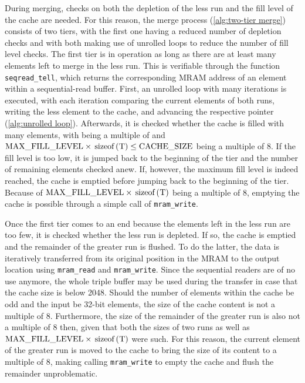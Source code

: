 During merging, checks on both the depletion of the less run and the fill level of the cache are needed.
For this reason, the merge process (\cref{alg:two-tier merge}) consists of two tiers, with the first one having a reduced number of depletion checks and with both making use of unrolled loops to reduce the number of fill level checks.
The first tier is in operation as long as there are at least \unrollfactor{} many elements left to merge in the less run.
This is verifiable through the function \lstinline|seqread_tell|, which returns the corresponding MRAM address of an element within a sequential-read buffer.
First, an unrolled loop with \unrollfactor{} many iterations is executed, with each iteration comparing the current elements of both runs, writing the less element to the cache, and advancing the respective pointer (\cref{alg:unrolled loop}).
Afterwards, it is checked whether the cache is filled with \unrolledcachelength{} many elements, with \unrolledcachelength{} being a multiple of \unrollfactor{} and \(\unrolledcachelength{} \times \text{\lstinline[keywords={}]|sizeof(T)|} \le \cachesize{}\) being a multiple of 8.
If the fill level is too low, it is jumped back to the beginning of the tier and the number of remaining elements checked anew.
If, however, the maximum fill level is indeed reached, the cache is emptied before jumping back to the beginning of the tier.
Because of \(\unrolledcachelength{} \times \text{\lstinline[keywords={}]|sizeof(T)|}\) being a multiple of 8, emptying the cache is possible through a simple call of \lstinline|mram_write|.

Once the first tier comes to an end because the elements left in the less run are too few, it is checked whether the less run is depleted.
If so, the cache is emptied and the remainder of the greater run is flushed.
To do the latter, the data is iteratively transferred from its original position in the MRAM to the output location using \lstinline|mram_read| and \lstinline|mram_write|.
Since the sequential readers are of no use anymore, the whole triple buffer may be used during the transfer in case that the cache size is below \qty{2048}{\byte}.
Should the number of elements within the cache be odd and the input be 32-bit elements, the size of the cache content is not a multiple of 8.
Furthermore, the size of the remainder of the greater run is also not a multiple of 8 then, given that both the sizes of two runs as well as \(\unrolledcachelength{} \times \text{\lstinline[keywords={}]|sizeof(T)|}\) were such.
For this reason, the current element of the greater run is moved to the cache to bring the size of its content to a multiple of 8, making calling \lstinline|mram_write| to empty the cache and flush the remainder unproblematic.

